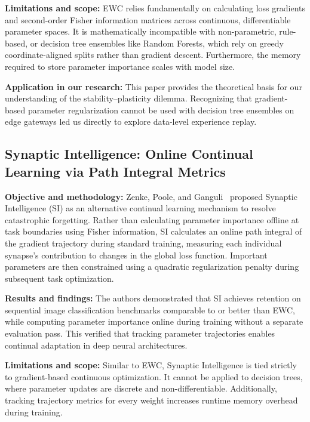 \smallskip
\noindent\textbf{Limitations and scope:} EWC relies fundamentally on calculating loss gradients and second-order Fisher information matrices across continuous, differentiable parameter spaces. It is mathematically incompatible with non-parametric, rule-based, or decision tree ensembles like Random Forests, which rely on greedy coordinate-aligned splits rather than gradient descent. Furthermore, the memory required to store parameter importance scales with model size.

\smallskip
\noindent\textbf{Application in our research:} This paper provides the theoretical basis for our understanding of the stability--plasticity dilemma. Recognizing that gradient-based parameter regularization cannot be used with decision tree ensembles on edge gateways led us directly to explore data-level experience replay.

\subsection{Synaptic Intelligence: Online Continual Learning via Path Integral Metrics}

\noindent\textbf{Objective and methodology:} Zenke, Poole, and Ganguli~\cite{zenke2017continual} proposed Synaptic Intelligence (SI) as an alternative continual learning mechanism to resolve catastrophic forgetting. Rather than calculating parameter importance offline at task boundaries using Fisher information, SI calculates an online path integral of the gradient trajectory during standard training, measuring each individual synapse's contribution to changes in the global loss function. Important parameters are then constrained using a quadratic regularization penalty during subsequent task optimization.

\smallskip
\noindent\textbf{Results and findings:} The authors demonstrated that SI achieves retention on sequential image classification benchmarks comparable to or better than EWC, while computing parameter importance online during training without a separate evaluation pass. This verified that tracking parameter trajectories enables continual adaptation in deep neural architectures.

\smallskip
\noindent\textbf{Limitations and scope:} Similar to EWC, Synaptic Intelligence is tied strictly to gradient-based continuous optimization. It cannot be applied to decision trees, where parameter updates are discrete and non-differentiable. Additionally, tracking trajectory metrics for every weight increases runtime memory overhead during training.

